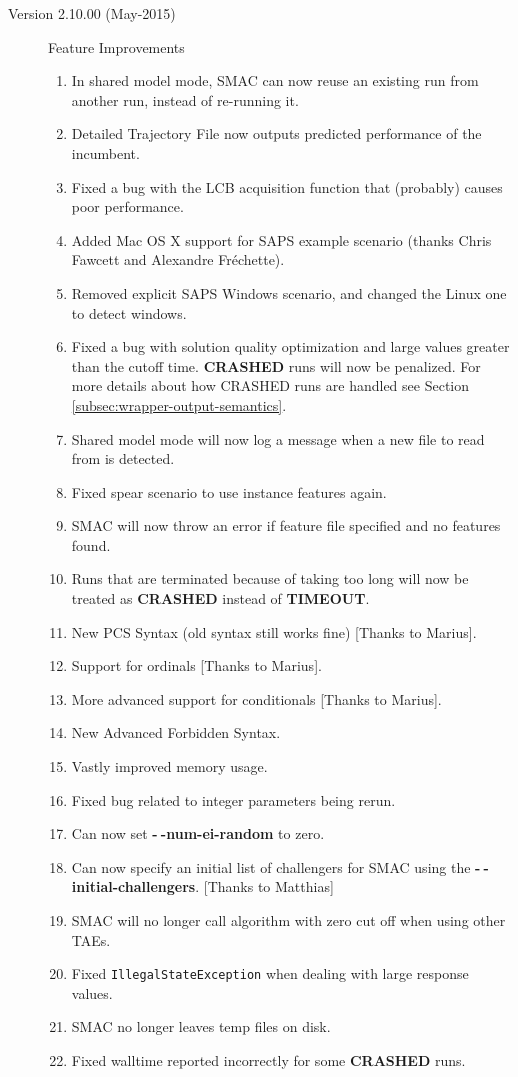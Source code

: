 \documentclass[11pt,letterpaper,oneside]{article}
\begin{document}
\begin{description}
\begin{enumerate}
          	\end{enumerate}
		\item[Version 2.10.00 (May-2015)] Feature Improvements
			\begin{enumerate}
				\item In shared model mode, SMAC can now reuse an existing run from another run, instead of re-running it.
				\item Detailed Trajectory File now outputs predicted performance of the incumbent.
				\item Fixed a bug with the LCB acquisition function that (probably) causes poor performance.
				\item Added Mac OS X support for SAPS example scenario (thanks Chris Fawcett and Alexandre Fr\'{e}chette).
				\item Removed explicit SAPS Windows scenario, and changed the Linux one to detect windows.
				\item Fixed a bug with solution quality optimization and large values greater than the cutoff time. \textbf{CRASHED} runs will now be penalized. For more details about how CRASHED runs are handled see Section \ref{subsec:wrapper-output-semantics}.
				\item Shared model mode will now log a message when a new file to read from is detected.
				\item Fixed spear scenario to use instance features again.
				\item SMAC will now throw an error if feature file specified and no features
				found.
				\item Runs that are terminated because of taking too long will now be treated as \textbf{CRASHED} instead of \textbf{TIMEOUT}.
				\item New PCS Syntax (old syntax still works fine) [Thanks to Marius].
				\item Support for ordinals [Thanks to Marius].
				\item More advanced support for conditionals [Thanks to Marius].
				\item New Advanced Forbidden Syntax.
				\item Vastly improved memory usage.
				\item Fixed bug related to integer parameters being rerun.
				\item Can now set \textbf{-$~\!$-num-ei-random} to zero.
				\item Can now specify an initial list of challengers for SMAC using the 
				\textbf{-$~\!$-initial-challengers}. [Thanks to Matthias]
				\item SMAC will no longer call algorithm with zero cut off when using other TAEs.
				\item Fixed \texttt{IllegalStateException} when dealing with large response values.
				\item SMAC no longer leaves temp files on disk.
				\item Fixed walltime reported incorrectly for some \textbf{CRASHED} runs.
				
			\end{enumerate}
           

	\end{description}
\end{document}

